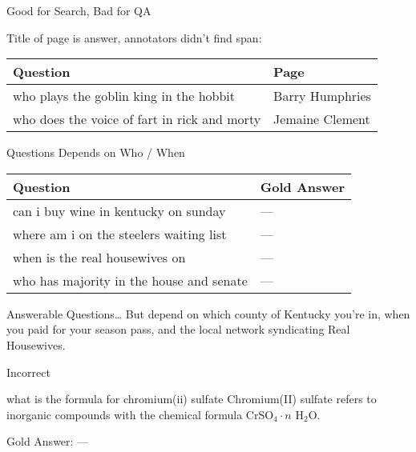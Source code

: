 \documentclass[xcolor=table]{beamer}
\begin{document}
\begin{frame}{Good for Search, Bad for QA}

  Title of page is answer, annotators didn't find span:
  \begin{tabular}{p{7cm}p{3cm}}
    \toprule
    Question & Page \\
    \hline
  who plays the goblin king in the hobbit &  Barry Humphries  \\
  who does the voice of fart in rick and morty & Jemaine Clement   \\
 \bottomrule
  \end{tabular}
  

\end{frame}

\begin{frame}{Questions Depends on Who / When}
  \begin{tabular}{p{8cm}p{2cm}}
    \toprule
    Question & Gold Answer \\
    \hline
    can i buy wine in kentucky on sunday & --- \\
    where am i on the steelers waiting list & --- \\
    when is the real housewives on & --- \\
    who has majority in the house and senate & --- \\
    \bottomrule
  \end{tabular}  

  \pause

  \begin{block}{Answerable Questions\dots}
  But depend on which county of Kentucky you're in,
  when you paid for your season pass, and the local network
  syndicating Real Housewives.
  \end{block}
  
\end{frame}


\begin{frame}{Incorrect}

  \begin{block}{what is the formula for chromium(ii) sulfate}
    Chromium(II) sulfate refers to inorganic compounds with the chemical formula CrSO$_4 \cdot n$ H$_2$O.
  \end{block}

  Gold Answer: ---

\end{frame}
\end{document}

